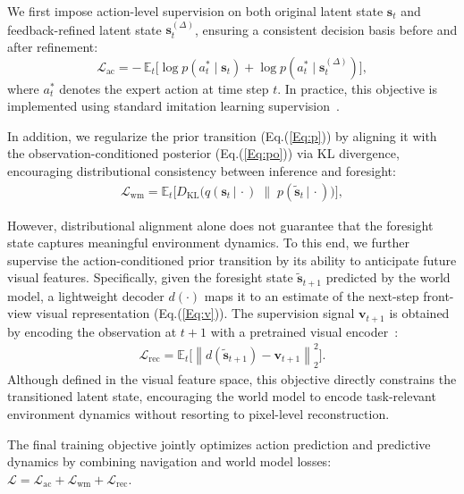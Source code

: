 \documentclass{article}
\theoremstyle{plain}
\theoremstyle{definition}
\theoremstyle{remark}
\begin{document}
We first impose action-level supervision on both original latent state $\boldsymbol{s}_t$ and feedback-refined latent state $\boldsymbol{s}_t^{(\Delta)}$, ensuring a consistent decision basis before and after refinement:
\begin{equation}
\mathcal{L}_{\mathrm{ac}}
=
- \, \mathbb{E}_{t}
\Big[
\log p(a_t^{*}\mid \boldsymbol{s}_t)
+
\log p(a_t^{*}\mid \boldsymbol{s}_t^{(\Delta)})
\Big],
\end{equation}
where $a_t^{*}$ denotes the expert action at time step $t$.
In practice, this objective is implemented using standard imitation learning supervision~\cite{an2024etpnav,wang2024sim}.

In addition, we regularize the prior transition (Eq.(\ref{Eq:p})) by aligning it with the observation-conditioned posterior (Eq.(\ref{Eq:po})) via KL divergence, encouraging distributional consistency between inference and foresight:
\begin{align}
\mathcal{L}_{\mathrm{wm}} =  
\mathbb{E}_{t}\Big[D_{\mathrm{KL}}\!\big(
q(\boldsymbol{s}_{t}\,|\,\cdot)
\;\big\|\;
p(\tilde{\boldsymbol{s}}_{t}\,|\,\cdot)
\big)\Big],
\end{align}

However, distributional alignment alone does not guarantee that the foresight state captures meaningful environment dynamics.
To this end, we further supervise the action-conditioned prior transition by its ability to anticipate future visual features.
Specifically, given the foresight state $\tilde{\boldsymbol{s}}_{t+1}$ predicted by the world model, a lightweight decoder $d(\cdot)$ maps it to an estimate of the next-step front-view visual representation (Eq.(\ref{Eq:v})).
The supervision signal $\boldsymbol{v}_{t+1}$ is obtained by encoding the observation at $t{+}1$ with a pretrained visual encoder~\cite{dosovitskiy2020image}:
\begin{align}\label{eq:rec}
  \mathcal{L}_{\mathrm{rec}} =    \mathbb{E}_{t}\Big[\left\|
d(\tilde{\boldsymbol{s}}_{t+1})-\boldsymbol{v}_{t+1}
\right\|_2^2\Big]. 
\end{align}
Although defined in the visual feature space, this objective directly constrains the transitioned latent state, encouraging the world model to encode task-relevant environment dynamics without resorting to pixel-level reconstruction.


The final training objective jointly optimizes action prediction and predictive dynamics by combining navigation and world model losses: $\mathcal{L}=\mathcal{L}_{\mathrm{ac}}+ \mathcal{L}_{\mathrm{wm}}+\mathcal{L}_{\mathrm{rec}}.$
\end{document}
